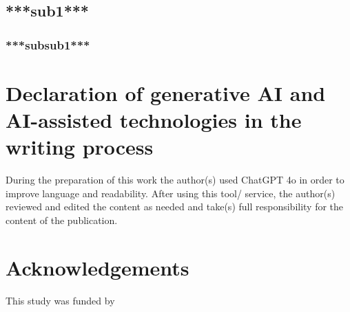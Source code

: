 \documentclass[a4paper,fleqn]{cas-dc}
\begin{document}
\subsection{***sub1***}
\label{sec:experiment}





\subsubsection{***subsub1***}







\section*{Declaration of generative AI and AI-assisted technologies in the writing process}
During the preparation of this work the author(s) used ChatGPT 4o in order to improve language and readability. After using this tool/ service, the author(s) reviewed and edited the content as needed and take(s) full responsibility for the content of the publication.
\printcredits


%
\section*{Acknowledgements}

This study was funded by 






\end{document}
